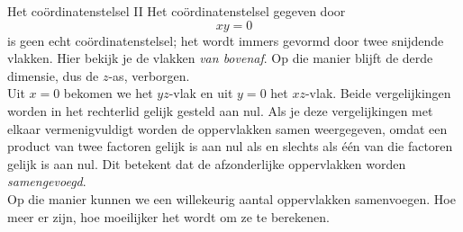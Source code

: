 \begin{surferPage}[Co\"ordinaten II]{Het co\"ordinatenstelsel II}
Het co\"ordinatenstelsel gegeven door
\[xy=0\]
is geen echt co\"ordinatenstelsel; het wordt immers gevormd door twee snijdende vlakken. Hier bekijk je de vlakken {\it van bovenaf}. Op die manier blijft de derde dimensie, dus de $z$-as, verborgen. \\
\vspace{0.3cm}
Uit $x=0$ bekomen we het $yz$-vlak en uit  $y = 0$ het $xz$-vlak.
Beide vergelijkingen worden in het rechterlid gelijk gesteld aan nul. Als je deze vergelijkingen met elkaar vermenigvuldigt worden de oppervlakken samen weergegeven, omdat een product van twee factoren gelijk is aan nul als en slechts als \'e\'en van die factoren gelijk is aan nul. Dit betekent dat de afzonderlijke oppervlakken worden {\it samengevoegd}. \\
Op die manier kunnen we een willekeurig aantal oppervlakken samenvoegen. Hoe meer er zijn, hoe moeilijker het wordt om ze te berekenen. 
\end{surferPage}
